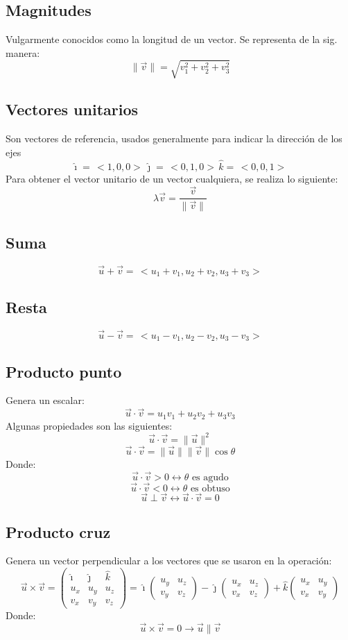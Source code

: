 \documentclass[letterpaper, 12pt]{article}
\begin{document}
    \subsection{Magnitudes}
    Vulgarmente conocidos como la longitud de un vector. Se representa de la sig. manera:
    \[\lVert\vec{v}\rVert=\sqrt{v_1^2+v_2^2+v_3^2}\]
    \subsection{Vectores unitarios}
    Son vectores de referencia, usados generalmente para indicar la dirección de los ejes
    \[\hat{\imath}=\,<\!1,0,0\!>\,\hat{\jmath}=\,<\!0,1,0\!>\,\hat{k}=\,<\!0,0,1\!>\,\]
    Para obtener el vector unitario de un vector cualquiera, se realiza lo siguiente:
    \[\lambda\vec{v}=\frac{\vec{v}}{\lVert\vec{v}\rVert}\]
    \subsection{Suma}
    \[\vec{u}+\vec{v}=\,<\!u_1+v_1,u_2+v_2,u_3+v_3\!>\]
    \subsection{Resta}
    \[\vec{u}-\vec{v}=\,<\!u_1-v_1,u_2-v_2,u_3-v_3\!>\]
    \subsection{Producto punto}
    Genera un escalar:
    \[\vec{u}\cdot\vec{v}=u_1v_1+u_2v_2+u_3v_3\]
    Algunas propiedades son las siguientes:
    \[\vec{u}\cdot\vec{v}=\lVert\vec{u}\rVert^2\]
    \[\vec{u}\cdot\vec{v}=\lVert\vec{u}\rVert\lVert\vec{v}\rVert\cos\theta\]
    Donde:
    \[\vec{u}\cdot\vec{v}>0\leftrightarrow\theta \text{ es agudo}\]
    \[\vec{u}\cdot\vec{v}<0\leftrightarrow\theta \text{ es obtuso}\]
    \[\vec{u}\perp\vec{v}\leftrightarrow\vec{u}\cdot\vec{v}=0\]
    \subsection{Producto cruz}
    Genera un vector perpendicular a los vectores que se usaron en la operación:
    \[\vec{u}\times\vec{v}=\begin{pmatrix}
    \hat{\imath} &\hat{\jmath}& \hat{k}\\
    u_x&u_y&u_z\\
    v_x&v_y&v_z
    \end{pmatrix}=\hat{\imath}\begin{pmatrix}
    u_y&u_z\\
    v_y&v_z
    \end{pmatrix}-\hat{\jmath}\begin{pmatrix}
    u_x&u_z\\
    v_x&v_z
    \end{pmatrix}+\hat{k}\begin{pmatrix}
    u_x&u_y\\
    v_x&v_y
    \end{pmatrix}\]
    Donde:
    \[\vec{u}\times\vec{v}=0\rightarrow\vec{u}\parallel\vec{v}\]
\end{document}
